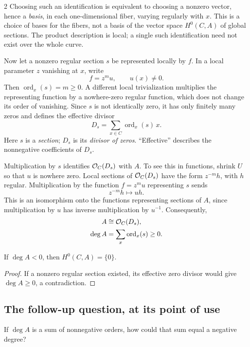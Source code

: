 \documentclass[12pt]{memoir}
\begin{document}
\begin{multicols}{2}
Choosing such an identification is equivalent to choosing a
nonzero vector, hence a \emph{basis}, in each one-dimensional fiber,
varying regularly with $x$. This is a choice of bases for the fibers,
not a basis of the vector space $H^0(C,A)$ of global sections.
The product description is local; a single such identification
need not exist over the whole curve.

Now let a nonzero regular section $s$ be represented locally by $f$.
In a local parameter $z$ vanishing at $x$, write
\[
 f=z^m u,\qquad u(x)\ne0.
\]
Then $\operatorname{ord}_x(s)=m\ge0$. A different local trivialization
multiplies the representing function by a nowhere-zero regular
function, which does not change its order of vanishing. Since $s$
is not identically zero, it has only finitely many zeros and defines
the effective divisor
\[
 D_s=\sum_{x\in C}\operatorname{ord}_x(s)\,x.
\]
Here $s$ is a \emph{section}; $D_s$ is its \emph{divisor of zeros}.
``Effective'' describes the nonnegative coefficients of $D_s$.

Multiplication by $s$ identifies $\mathcal{O}_C(D_s)$ with $A$.
To see this in functions, shrink $U$ so that $u$ is nowhere zero.
Local sections of $\mathcal{O}_C(D_s)$ have the form $z^{-m}h$, with $h$
regular. Multiplication by the function $f=z^m u$ representing $s$
sends
\[
 z^{-m}h\longmapsto uh.
\]
This is an isomorphism onto the functions representing sections of
$A$, since multiplication by $u$ has inverse multiplication by
$u^{-1}$. Consequently,
\[
\begin{aligned}
 A&\cong\mathcal{O}_C(D_s),\\
 \deg A&=\sum_x\operatorname{ord}_x(s)\ge0.
\end{aligned}
\]

\begin{Lem}\label{lem:negative}
If $\deg A<0$, then $H^0(C,A)=\{0\}$.
\end{Lem}
\begin{proof}
If a nonzero regular section existed, its effective zero divisor
would give $\deg A\ge0$, a contradiction.
\end{proof}

\subsection{The follow-up question, at its point of use}
\begin{Qn}
If $\deg A$ is a sum of nonnegative orders, how could that sum equal
a negative degree?
\end{Qn}


\end{multicols}
\end{document}
